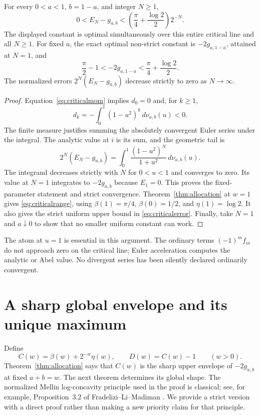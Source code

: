 \begin{theorem}\label{thm:criticalconstant}
For every $0<a<1$, $b=1-a$, and integer $N\ge1$,
\begin{equation}\label{eq:criticalerror}
 0<E_N-g_{a,b}<
 \left(\frac\pi4+\frac{\log2}{2}\right)2^{-N}.
\end{equation}
The displayed constant is optimal simultaneously over this entire
critical line and all $N\ge1$. For fixed $a$, the exact optimal
non-strict constant is $-2g_{a,1-a}$, attained at $N=1$, and
\begin{equation}\label{eq:criticalrange}
 \frac\pi2-1<-2g_{a,1-a}<\frac\pi4+\frac{\log2}{2}.
\end{equation}
The normalized errors $2^N(E_N-g_{a,b})$ decrease strictly to zero as
$N\to\infty$.
\end{theorem}
\begin{proof}
Equation~\eqref{eq:criticalmom} implies $d_0=0$ and, for $k\ge1$,
\[
 d_k=-\int_0^1(1-u^2)^k\,d\nu_{a,b}(u)<0.
\]
The finite measure justifies summing the absolutely convergent Euler
series under the integral. The analytic value at $i$ is its sum, and
the geometric tail is
\begin{equation}\label{eq:atomicerror}
 2^N(E_N-g_{a,b})=
 \int_0^1\frac{(1-u^2)^N}{1+u^2}\,d\nu_{a,b}(u).
\end{equation}
The integrand decreases strictly with $N$ for $0<u<1$ and converges
to zero. Its value at $N=1$ integrates to $-2g_{a,b}$ because $E_1=0$.
This proves the fixed-parameter statement and strict convergence.
Theorem~\ref{thm:allocation} at $w=1$ gives \eqref{eq:criticalrange},
using $\beta(1)=\pi/4$, $\beta(0)=1/2$, and $\eta(1)=\log2$.
It also gives the strict uniform upper bound in \eqref{eq:criticalerror}.
Finally, take $N=1$ and $a\downarrow0$ to show that no smaller uniform
constant can work.
\end{proof}

The atom at $u=1$ is essential in this argument. The ordinary terms
$(-1)^m f_m$ do not approach zero on the critical line; Euler acceleration
computes the analytic or Abel value. No divergent series has been
silently declared ordinarily convergent.

\section{A sharp global envelope and its unique maximum}
\label{sec:envelope}

Define
\begin{equation}\label{eq:Cdef}
 C(w)=\beta(w)+2^{-w}\eta(w),\qquad D(w)=C(w)-1\qquad(w>0).
\end{equation}
Theorem~\ref{thm:allocation} says that $C(w)$ is the sharp upper
envelope of $-2g_{a,b}$ at fixed $a+b=w$. The next theorem determines
its global shape. The normalized Mellin log-concavity principle used
in the proof is classical; see, for example, Proposition~3.2 of
Fradelizi--Li--Madiman \cite{flm}. We provide a strict version with
a direct proof rather than making a new priority claim for that principle.

